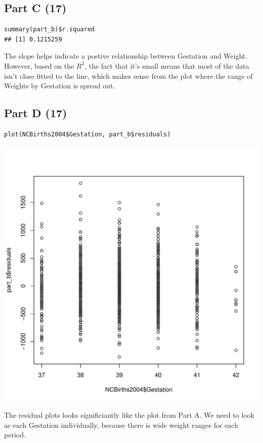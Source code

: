 \documentclass{article}\usepackage[]{graphicx}\usepackage[]{color}
\makeatletter
\newenvironment{kframe}{%
 \def\at@end@of@kframe{}%
 \ifinner\ifhmode%
  \def\at@end@of@kframe{\end{minipage}}%
  \begin{minipage}{\columnwidth}%
 \fi\fi%
 \def\FrameCommand##1{\hskip\@totalleftmargin \hskip-\fboxsep
 \colorbox{shadecolor}{##1}\hskip-\fboxsep
     \hskip-\linewidth \hskip-\@totalleftmargin \hskip\columnwidth}%
 \MakeFramed {\advance\hsize-\width
   \@totalleftmargin\z@ \linewidth\hsize
   \@setminipage}}%
 {\par\unskip\endMakeFramed%
 \at@end@of@kframe}
\newenvironment{knitrout}{}{} %
\makeatother
\begin{document}
\subsection*{Part C (17)}
\begin{knitrout}
\color{fgcolor}\begin{kframe}
\begin{verbatim}
summary(part_b)$r.squared
## [1] 0.1215259
\end{verbatim}
\end{kframe}
\end{knitrout}
The slope helps indicate a postive relationship between Gestation and Weight. However, based on the $R^2$, the fact that it's small means that most of the data isn't close fitted to the line, which makes sense from the plot where the range of Weights by Gestation is spread out.
\subsection*{Part D (17)}
\begin{knitrout}
\color{fgcolor}\begin{kframe}
\begin{verbatim}
plot(NCBirths2004$Gestation, part_b$residuals)
\end{verbatim}
\end{kframe}
\includegraphics[width=0.33\linewidth]{figure/unnamed-chunk-22-1} 

\end{knitrout}
The residual plots looks significiantly like the plot from Part A. We need to look as each Gestation individually, because there is wide weight ranges for each period.
\end{document}
